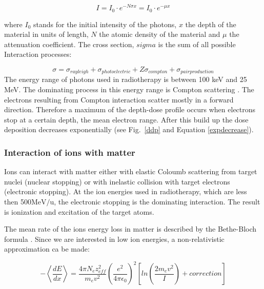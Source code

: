\documentclass[type=dr, dr=rernat, accentcolor=tud7b,colorbacktitle, bigchapter, openright, twoside, 12pt ]{tudthesis}
\begin{document}
\begin{equation}
 I = I_{0} \cdot e^{- N \sigma x} = I_{0} \cdot e^{-\mu x}
 \label{expdecrease}
\end{equation} 

where $I_{0}$ stands for the initial intensity of the photons, $x$ the depth of the material in units of length, $N$ the atomic density of the material and $\mu$ the attenuation coefficient. The cross section, $sigma$ is the sum of all possible Interaction processes:

\begin{equation}
{\sigma} = \sigma_{rayleigh} + \sigma_{photoelectric} + Z\sigma_{compton} + \sigma_{pairproduction} 
\end{equation}
The energy range of photons used in radiotherapy is between 100 keV and 25 MeV. The dominating process in this energy range is Compton scattering \cite{Alpen1998}.
The electrons resulting from Compton interaction scatter mostly in a forward direction. Therefore a maximum of the depth-dose profile occurs when electrons stop at a certain depth, 
the mean electron range. After this build up the dose deposition decreases exponentially (see Fig.~\ref{ddp} and Equation \ref{expdecrease}).

\subsubsection{Interaction of ions with matter}
\label{iion}
Ions can interact with matter either with elastic Coloumb scattering from target nuclei (nuclear stopping) or with inelastic collision with target electrons (electronic stopping).
At the ion energies used in radiotherapy, which are less then 500$\mathrm{MeV}/\mathrm{u}$, the electronic stopping is the dominating interaction. The result is ionization and excitation of the target atoms.

The mean rate of the ions energy loss in matter is described by the Bethe-Bloch formula \cite{Bethe1930, Bloch1933}. Since we are interested in low ion energies, a non-relativistic approximation ca be made:

\begin{equation}
- \left \langle \frac{dE}{dx} \right \rangle = \frac{ 4 \pi N_{e} z_{eff}^{2} }{ m_{e} v^{2} } \left( \frac{e^{2}}{4\pi \epsilon_{0}} \right) ^{2} \left[ln \left( \frac{2m_{e}v^{2}}{I} \right)+correction \right]
 \label{bethe}
\end{equation}
\end{document}
